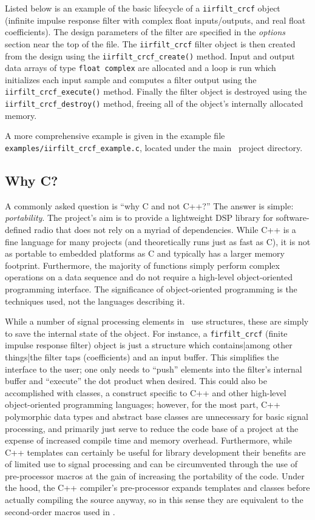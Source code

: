 Listed below is an example of the basic lifecycle of a
{\tt iirfilt\_crcf} object (infinite impulse response filter with
complex float inputs/outputs, and real float coefficients).
The design parameters of the filter are specified in the {\em options}
section near the top of the file.
The {\tt iirfilt\_crcf} filter object is then created from the design
using the {\tt iirfilt\_crcf\_create()} method.
Input and output data arrays of type {\tt float complex} are allocated
and a loop is run which initializes each input sample and computes a
filter output using the {\tt iirfilt\_crcf\_execute()} method.
Finally the filter object is destroyed using the
{\tt iirfilt\_crcf\_destroy()} method,
freeing all of the object's internally allocated memory.
%

%
A more comprehensive example is given in the example file
{\tt examples/iirfilt\_crcf\_example.c},
located under the main \liquid\ project directory.

\subsection{Why C?}
\label{section:data_structures:why_C}
A commonly asked question is ``why C and not C++?''
The answer is simple: {\em portability}.
The project's aim is to provide a lightweight DSP library for
software-defined radio that does not rely on a myriad of dependencies.
While C++ is a fine language for many projects
(and theoretically runs just as fast as C),
it is not as portable to embedded platforms as C and typically has a
larger memory footprint.
Furthermore, the majority of functions simply perform complex operations on a
data sequence and do not require a high-level object-oriented programming
interface.
The significance of object-oriented programming is the techniques used,
not the languages describing it.

While a number of signal processing elements in \liquid\ use structures, these
are simply to save the internal state of the object.
For instance, a {\tt firfilt\_crcf} (finite impulse response filter) object
is just a structure which contains|among other things|the filter taps
(coefficients) and an input buffer.
This simplifies the interface to the user; one only needs to ``push'' elements
into the filter's internal buffer and ``execute'' the dot product when
desired.
This could also be accomplished with classes, a construct specific to C++ and
other high-level object-oriented programming languages;
however,
for the most part, C++ polymorphic data types and abstract base classes are
unnecessary for basic signal processing, and primarily just serve to reduce
the code base of a project at the expense of increased compile time and
memory overhead.
Furthermore, while C++ templates can certainly be useful for library
development
their benefits are of limited use to signal processing and can be circumvented
through the use of pre-processor macros at the gain of increasing the
portability of the code.
Under the hood, the C++ compiler's pre-processor expands templates and classes
before actually compiling the source anyway, so in this sense they are
equivalent to the second-order macros used in \liquid.

